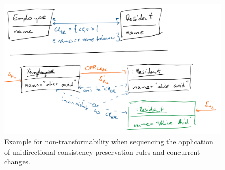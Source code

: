 \begin{figure}
    \centering
    \includegraphics[width=\textwidth]{figures/correctness/synchronization/non_transformability.png}
    \caption[Non-transformability in sequencing scenario]{Example for non-transformability when sequencing the application of unidirectional consistency preservation rules and concurrent changes.}
    \label{fig:synchronization:non_transformability}
\end{figure}


